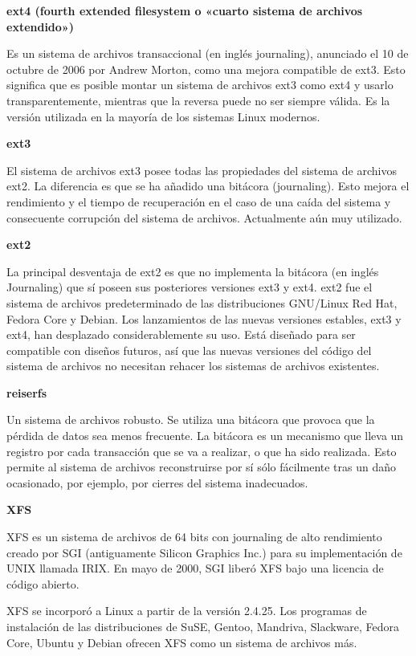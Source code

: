 \documentclass[12pt]{article}
\begin{document}
{\bf ext4 (fourth extended filesystem o «cuarto sistema de archivos 
extendido»)}

Es un sistema de archivos transaccional (en inglés journaling), anunciado 
el 10 de octubre de 2006 por Andrew Morton, como una mejora compatible de 
ext3. Esto significa que es posible montar un sistema de archivos ext3 como
ext4 y usarlo transparentemente, mientras que la reversa puede no ser 
siempre válida. Es la versión utilizada en la mayoría de los sistemas Linux
modernos. 

{\bf ext3}

    El sistema de archivos ext3 posee todas las propiedades del sistema de
archivos ext2. La diferencia es que se ha añadido una bitácora (journaling).
Esto mejora el rendimiento y el tiempo de recuperación en el caso de una 
caída del sistema y consecuente corrupción del sistema de archivos. 
Actualmente aún muy utilizado. 

{\bf ext2}

La principal desventaja de ext2 es que no implementa la bitácora (en inglés
Journaling) que sí poseen sus posteriores versiones ext3 y ext4. ext2 fue 
el sistema de archivos predeterminado de las distribuciones GNU/Linux Red 
Hat, Fedora Core y Debian. Los lanzamientos de las nuevas versiones 
estables, ext3 y ext4, han desplazado considerablemente su uso. Está 
diseñado para ser compatible con diseños futuros, así que las nuevas 
versiones del código del sistema de archivos no  necesitan rehacer los 
sistemas de archivos existentes.

{\bf reiserfs}

    Un sistema de archivos robusto. Se utiliza una bitácora que provoca
que la pérdida de datos sea menos frecuente. La bitácora es un mecanismo 
que lleva un registro por cada transacción que se va a realizar, o que ha 
sido realizada. Esto permite al sistema de archivos reconstruirse por sí 
sólo fácilmente tras un daño ocasionado, por ejemplo, por cierres del 
sistema inadecuados. 

{\bf XFS  }

XFS es un sistema de archivos de 64 bits con journaling de alto rendimiento
creado por SGI (antiguamente Silicon Graphics Inc.) para su implementación 
de UNIX llamada IRIX. En mayo de 2000, SGI liberó XFS bajo una licencia de 
código abierto. 

XFS se incorporó a Linux a partir de la versión 2.4.25. Los programas de 
instalación de las distribuciones de SuSE, Gentoo, Mandriva, Slackware, 
Fedora Core, Ubuntu y Debian ofrecen XFS como un sistema de archivos más.
\end{document}
